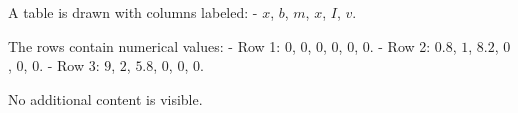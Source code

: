 A table is drawn with columns labeled:  
- \( x \), \( b \), \( m \), \( x \), \( I \), \( v \).  

The rows contain numerical values:  
- Row 1: \( 0 \), \( 0 \), \( 0 \), \( 0 \), \( 0 \), \( 0 \).  
- Row 2: \( 0.8 \), \( 1 \), \( 8.2 \), \( 0 \), \( 0 \), \( 0 \).  
- Row 3: \( 9 \), \( 2 \), \( 5.8 \), \( 0 \), \( 0 \), \( 0 \).  

No additional content is visible.